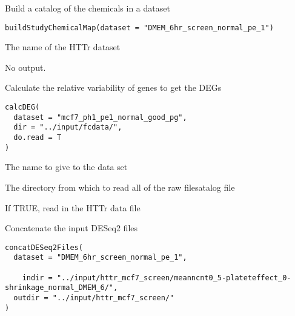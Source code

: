 \documentclass[letterpaper]{book}
\begin{document}
%
\begin{Description}\relax
Build a catalog of the chemicals in a dataset
\end{Description}
%
\begin{Usage}
\begin{verbatim}
buildStudyChemicalMap(dataset = "DMEM_6hr_screen_normal_pe_1")
\end{verbatim}
\end{Usage}
%
\begin{Arguments}
\begin{ldescription}
\item[\code{dataset}] The name of the HTTr dataset
\end{ldescription}
\end{Arguments}
%
\begin{Value}
No output.
\end{Value}
%
\begin{Description}\relax
Calculate the relative variability of genes to get the DEGs
\end{Description}
%
\begin{Usage}
\begin{verbatim}
calcDEG(
  dataset = "mcf7_ph1_pe1_normal_good_pg",
  dir = "../input/fcdata/",
  do.read = T
)
\end{verbatim}
\end{Usage}
%
\begin{Arguments}
\begin{ldescription}
\item[\code{dataset}] The name to give to the data set

\item[\code{dir}] The directory from which to read all of the raw filesatalog file

\item[\code{do.read}] If TRUE, read in the HTTr data file
\end{ldescription}
\end{Arguments}
%
\begin{Description}\relax
Concatenate the input DESeq2 files
\end{Description}
%
\begin{Usage}
\begin{verbatim}
concatDESeq2Files(
  dataset = "DMEM_6hr_screen_normal_pe_1",
 
    indir = "../input/httr_mcf7_screen/meanncnt0_5-plateteffect_0-shrinkage_normal_DMEM_6/",
  outdir = "../input/httr_mcf7_screen/"
)
\end{verbatim}
\end{Usage}
\end{document}

